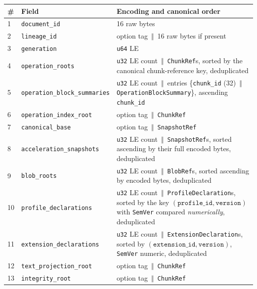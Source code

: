 \documentclass[11pt,letterpaper]{report}
\newcommand{\tablenums}[1]{{\addfontfeatures{Numbers={Lining,Tabular}}#1}}
\newcommand{\cat}{\ensuremath{\,\Vert\,}}
\begin{document}
\begingroup\small
\begin{longtable}{p{0.3in} p{1.9in} p{3.45in}}
  \toprule
  \textbf{\#} & \textbf{Field} & \textbf{Encoding and canonical order} \\
  \midrule
  \endhead
  \tablenums{1} & \texttt{document\_id} & 16 raw bytes \\
  \tablenums{2} & \texttt{lineage\_id} & option tag \cat{} 16 raw bytes if
    present \\
  \tablenums{3} & \texttt{generation} & \texttt{u64} LE \\
  \tablenums{4} & \texttt{operation\_roots} & \texttt{u32} LE count \cat{}
    \texttt{ChunkRef}s, sorted by the canonical chunk-reference key,
    deduplicated \\
  \tablenums{5} & \texttt{operation\_block\_summaries} & \texttt{u32} LE
    count \cat{} entries \{\texttt{chunk\_id} (32) \cat{}
    \texttt{OperationBlockSummary}\}, ascending \texttt{chunk\_id} \\
  \tablenums{6} & \texttt{operation\_index\_root} & option tag \cat{}
    \texttt{ChunkRef} \\
  \tablenums{7} & \texttt{canonical\_base} & option tag \cat{}
    \texttt{SnapshotRef} \\
  \tablenums{8} & \texttt{acceleration\_snapshots} & \texttt{u32} LE count
    \cat{} \texttt{SnapshotRef}s, sorted ascending by their full encoded
    bytes, deduplicated \\
  \tablenums{9} & \texttt{blob\_roots} & \texttt{u32} LE count \cat{}
    \texttt{BlobRef}s, sorted ascending by encoded bytes, deduplicated \\
  \tablenums{10} & \texttt{profile\_declarations} & \texttt{u32} LE count
    \cat{} \texttt{ProfileDeclaration}s, sorted by the key
    $(\texttt{profile\_id}, \texttt{version})$ with \texttt{SemVer} compared
    \emph{numerically}, deduplicated \\
  \tablenums{11} & \texttt{extension\_declarations} & \texttt{u32} LE count
    \cat{} \texttt{ExtensionDeclaration}s, sorted by
    $(\texttt{extension\_id}, \texttt{version})$, \texttt{SemVer} numeric,
    deduplicated \\
  \tablenums{12} & \texttt{text\_projection\_root} & option tag \cat{}
    \texttt{ChunkRef} \\
  \tablenums{13} & \texttt{integrity\_root} & option tag \cat{}
    \texttt{ChunkRef} \\
  \bottomrule
\end{longtable}
\endgroup
\end{document}
